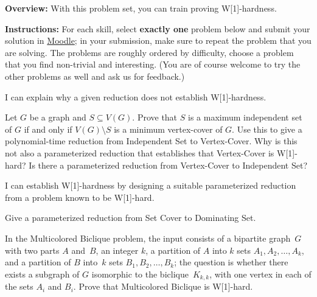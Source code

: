 \documentclass[english]{uebung_cs}
\begin{document}
\textbf{Overview:} With this problem set, you can train proving \textnormal{W[1]}-hardness.

\textbf{Instructions:} For each skill, select \textbf{exactly one} problem below and submit your solution in \href{https://moodle.studiumdigitale.uni-frankfurt.de/moodle/course/view.php?id=6259}{Moodle}; in your submission, make sure to repeat the problem that you are solving.
The problems are roughly ordered by difficulty, choose a problem that you find non-trivial and interesting. (You are of course welcome to try the other problems as well and ask us for feedback.)

\begin{skill}
  I can explain why a given reduction does not establish \textnormal{W[1]}-hardness.
\end{skill}

\begin{exercise}
  Let $G$ be a graph and $S\subseteq V(G)$.
  Prove that $S$ is a maximum independent set of $G$ if and only if $V(G)\setminus S$ is a minimum vertex-cover of $G$.
  Use this to give a polynomial-time reduction from Independent Set to Vertex-Cover.
  Why is this not also a parameterized reduction that establishes that Vertex-Cover is \textnormal{W[1]}-hard? Is there a parameterized reduction from Vertex-Cover to Independent Set?
\end{exercise}

\begin{skill}
  I can establish \textnormal{W[1]}-hardness by designing a suitable parameterized reduction from a problem known to be \textnormal{W[1]}-hard.
\end{skill}

\begin{exercise}
  Give a parameterized reduction from Set Cover to Dominating Set.
\end{exercise}

\begin{exercise}
  In the Multicolored Biclique problem, the input consists of a bipartite graph~\( G \) with two parts \( A\) and~\(B \), an integer \( k \), a partition of \( A \) into \( k \) sets \( A_1, A_2, \ldots, A_k \), and a partition of \( B \) into~\( k \) sets \( B_1, B_2, \ldots, B_k \); the question is whether there exists a subgraph of \( G \) isomorphic to the biclique~\( K_{k,k} \), with one vertex in each of the sets \( A_i \) and \( B_i \). Prove that Multicolored Biclique is \textnormal{W[1]}-hard.
\end{exercise}
\end{document}
